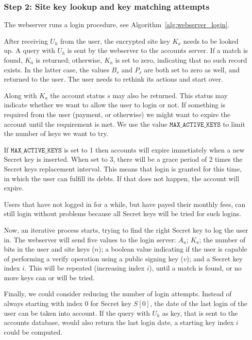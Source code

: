 \subsubsection{Step 2: Site key lookup and key matching attempts}
\label{sec:login_step2}
The webserver runs a login procedure,
see Algorithm~\vref{alg:webserver_login}.
\par
After receiving $U_h$ from the user, the encrypted site key $K_a$ needs to be looked up.
A query with $U_h$ is sent by the webserver to the accounts server.
If a match is found, $K_a$ is returned;
otherwise, $K_a$ is set to zero, indicating that no such record exists.
In the latter case, the values $B_s$ and $P_s$ are both set to zero as well, and returned to the user.
The user needs to rethink its actions and start over.
\par
Along with $K_a$ the account status $s$ may also be returned.
This status may indicate whether we want to allow the user to login or not.
If something is required from the user
(payment, or otherwise)
we might want to expire the account until the requirement is met.
We use the value $\mathtt{MAX\_ACTIVE\_KEYS}$ to limit the number of keys we want to try.
\par
If $\mathtt{MAX\_ACTIVE\_KEYS}$ is set to 1 then accounts will expire immetiately when a new Secret key is inserted.
When set to 3,
there will be a grace period of 2 times the Secret keys replacement interval.
This means that login is granted for this time,
in which the user can fulfill its debts.
If that does not happen,
the account will expire.
\par
Users that have not logged in for a while,
but have payed their monthly fees,
can still login without problems because all Secret keys will be tried for such logins.
\par
Now,
an iterative process starts,
trying to find the right Secret key to log the user in.
The webserver will send five values to the login server:
$A_u$;
$K_a$;
the number of bits in the user and site keys ($n$);
a boolean value indicating if the user is capable of performing a verify operation using a public signing key ($v$);
and a Secret key index $i$.
This will be repeated
(increasing index $i$),
until a match is found,
or no more keys can or will be tried.
\par
Finally, we could consider reducing the number of login attempts.
Instead of always starting with index $0$ for Secret key $S[0]$,
the date of the last login of the user can be taken into account.
If the query with $U_h$ as key,
that is sent to the accounts database,
would also return the last login date,
a starting key index $i$ could be computed.

